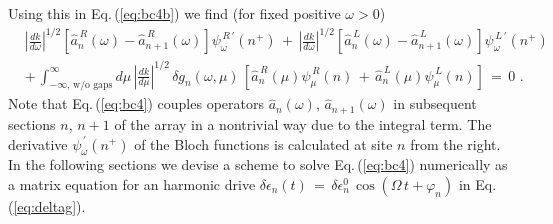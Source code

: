Using this in Eq.\,(\ref{eq:bc4b}) we find (for fixed positive $\omega>0$)
%
\begin{equation} \label{eq:bc4}
\begin{split}
& \left| \frac{dk}{d\omega} \right|^{1/2} \left[ \hat{a}_n^{\,R}(\omega) - \hat{a}_{n+1}^{\,R}(\omega) \right] 
\psi_{\omega}^{\,R\,'}(n^+) \, + \, 
\left| \frac{dk}{d\omega} \right|^{1/2} \left[ \hat{a}_n^{\,L}(\omega) - \hat{a}_{n+1}^{\,L}(\omega) \right] 
\psi_{\omega}^{\,L\,'}(n^+) \\[3mm]
& + \, \int_{-\infty, \, \text{w/o gaps}}^{\infty} d\mu \, \left| \frac{dk}{d\mu} \right|^{1/2} \,
\delta g_n(\omega, \mu) \, 
\left[ \hat{a}_n^{\,R}(\mu) \psi_{\mu}^{\,R}(n) \, + \, 
    \hat{a}_n^{\,L}(\mu) \psi_{\mu}^{\,L}(n) \right] \, = \, 0 \, \, .
\end{split}
\end{equation}
%
Note that Eq.\,(\ref{eq:bc4}) couples operators $\hat{a}_n(\omega)$, $\hat{a}_{n+1}(\omega)$ in 
subsequent sections $n$, $n+1$ of the array in a nontrivial way due to the integral term. 
The derivative $\psi_{\omega}^{\,'}(n^+)$ of the Bloch functions is calculated at site $n$ from the right. 
In the following sections we devise a scheme to solve Eq.\,(\ref{eq:bc4}) numerically as 
a matrix equation for an harmonic drive 
$\delta \epsilon_n(t) \, = \, \delta \epsilon_n^0 \, \cos(\Omega \, t + \varphi_n)$
in Eq.\,(\ref{eq:deltag}).



